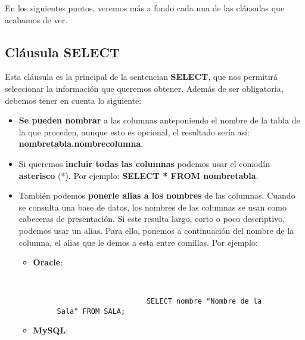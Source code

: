 En los siguientes puntos, veremos más a fondo cada una de las cláusulas que acabamos de ver.

\subsection{Cláusula SELECT}
Esta cláusula es la principal de la sentencian \textbf{SELECT}, que nos permitirá seleccionar la información que queremos obtener. Además de ser obligatoria, debemos tener en cuenta lo siguiente:

\begin{itemize}
    \item \textbf{Se pueden nombrar} a las columnas anteponiendo el nombre de la tabla de la que proceden, aunque esto es opcional, el resultado sería así: \textbf{nombretabla.nombrecolumna}.

    \item Si queremos \textbf{incluir todas las columnas} podemos usar el comodín \textbf{asterisco} (*). Por ejemplo: \textbf{SELECT * FROM nombretabla}.

    \item También podemos \textbf{ponerle alias a los nombres} de las columnas. Cuando se consulta una base de datos, los nombres de las columnas se usan como cabeceras de presentación. Si este resulta largo, corto o poco descriptivo, podemos usar un alias. Para ello, ponemos a continuación del nombre de la columna, el alias que le demos a esta entre comillas. Por ejemplo:

    \begin{itemize}
        \item \textbf{Oracle}:

        \begin{figure}[H]
            \begin{tcolorbox}[sharp corners, colback=yellow!30, colframe=white!20]
                \scriptsize
                \begin{verbatim}


                     SELECT nombre "Nombre de la Sala" FROM SALA;
                \end{verbatim}
            \end{tcolorbox}
        \end{figure}

         \item \textbf{MySQL}:

         \begin{figure}[H]
         \begin{tcolorbox}[sharp corners, colback=yellow!30, colframe=white!20]
             \scriptsize
             \begin{verbatim}



\end{verbatim}
\end{tcolorbox}
\end{figure}
\end{itemize}
\end{itemize}
